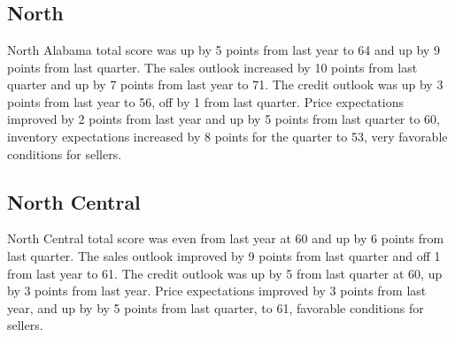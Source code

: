 \documentclass[11pt]{article}
\begin{document}
    \begin{center}
    \end{center}
    { \hspace*{\fill} \\}
    
    \begin{center}
    \end{center}
    { \hspace*{\fill} \\}
    
    \begin{center}
    \end{center}
    { \hspace*{\fill} \\}
    
    \subsection{North}\label{north}

    North Alabama total score was up by 5 points from last year to 64 and up
by 9 points from last quarter. The sales outlook increased by 10 points
from last quarter and up by 7 points from last year to 71. The credit
outlook was up by 3 points from last year to 56, off by 1 from last
quarter. Price expectations improved by 2 points from last year and up
by 5 points from last quarter to 60, inventory expectations increased by
8 points for the quarter to 53, very favorable conditions for sellers.

    \subsection{North Central}\label{north-central}

    North Central total score was even from last year at 60 and up by 6
points from last quarter. The sales outlook improved by 9 points from
last quarter and off 1 from last year to 61. The credit outlook was up
by 5 from last quarter at 60, up by 3 points from last year. Price
expectations improved by 3 points from last year, and up by by 5 points
from last quarter, to 61, favorable conditions for sellers.
\end{document}
